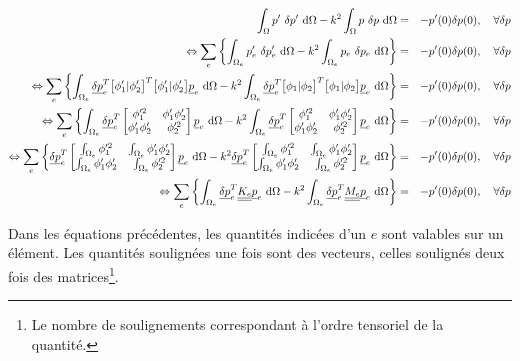 \begin{eqnarray}
    \int_\Omega p'~\delta p'~\mathrm{d}\Omega - k^2\int_\Omega p~\delta p~\mathrm{d}\Omega & = & -p'(0)\delta p(0), \quad \forall\delta p\notag\\
    \Leftrightarrow \sum_e \left\{\int_{\Omega_e} p_e'~\delta p_e'~\mathrm{d}\Omega
        - k^2\int_{\Omega_e} p_e~\delta p_e~\mathrm{d}\Omega \right\}
        & = & -p'(0)\delta p(0), \quad \forall\delta p \notag\\
    \Leftrightarrow \sum_e \left\{\int_{\Omega_e}
        \underline{\delta p}_e^T\big[\phi_1'|\phi_2'\big]^T\big[\phi_1'|\phi_2'\big]\underline{p}_e~\mathrm{d}\Omega
        - k^2\int_{\Omega_e}
        \underline{\delta p}_e^T\big[\phi_1|\phi_2\big]^T\big[\phi_1|\phi_2\big]\underline{p}_e~\mathrm{d}\Omega \right\}
        & = & -p'(0)\delta p(0), \quad \forall\delta p\notag\\
    \Leftrightarrow \sum_e \left\{\int_{\Omega_e}
    \underline{\delta p}_e^T\begin{bmatrix}\phi_1'^2 & \phi_1'\phi_2'\\\phi_1'\phi_2'& \phi_2'^2\end{bmatrix}\underline{p}_e~\mathrm{d}\Omega
        - k^2\int_{\Omega_e}
\underline{\delta p}_e^T\begin{bmatrix}\phi_1'^2 & \phi_1'\phi_2'\\\phi_1'\phi_2' & \phi_2'^2\end{bmatrix}\underline{p}_e~\mathrm{d}\Omega \right\}
        & = & -p'(0)\delta p(0), \quad \forall\delta p\notag\\
    \Leftrightarrow \sum_e \left\{
    \underline{\delta p}_e^T\begin{bmatrix}\int_{\Omega_e}\phi_1'^2 & \int_{\Omega_e}\phi_1'\phi_2'\\\int_{\Omega_e}\phi_1'\phi_2'& \int_{\Omega_e}\phi_2'^2\end{bmatrix}\underline{p}_e~\mathrm{d}\Omega
        - k^2
\underline{\delta p}_e^T\begin{bmatrix}\int_{\Omega_e}\phi_1'^2 & \int_{\Omega_e}\phi_1'\phi_2'\\\int_{\Omega_e}\phi_1'\phi_2' & \int_{\Omega_e}\phi_2'^2\end{bmatrix}\underline{p}_e~\mathrm{d}\Omega \right\}
        & = & -p'(0)\delta p(0), \quad \forall\delta p\notag\\
    \Leftrightarrow \sum_e \left\{\int_{\Omega_e}
        \underline{\delta p}_e^T\underline{\underline{K_e}}\underline{p}_e~\mathrm{d}\Omega - k^2\int_{\Omega_e} \underline{\delta p}_e^T\underline{\underline{M_e}}\underline{p}_e~\mathrm{d}\Omega \right\}
        & = & -p'(0)\delta p(0), \quad \forall\delta p\notag\\\label{FEM1D:elem_mat}
\end{eqnarray}

Dans les équations précédentes, les quantités indicées d'un $e$ sont valables sur un élément. Les quantités soulignées
une fois sont des vecteurs, celles soulignés deux fois des matrices\footnote{Le nombre de soulignements correspondant à
l'ordre tensoriel de la quantité.}.

